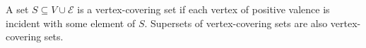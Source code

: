 A set $S \subseteq V \cup \mathcal{E}$ is a vertex-covering set if each vertex of positive valence is incident with some element of $S$. Supersets of vertex-covering sets are also vertex-covering sets.